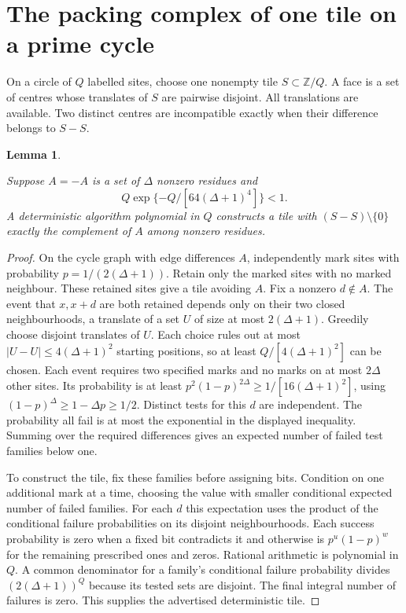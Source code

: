 \documentclass[11pt,letterpaper]{article}
\newtheorem{lemma}[theorem]{Lemma}
\numberwithin{equation}{section}
\begin{document}
\section{The packing complex of one tile on a prime cycle}\label{sec:prime}

On a circle of \(Q\) labelled sites, choose one nonempty tile \(S\subset\mathbb Z/Q\). A face
is a set of centres whose translates of \(S\) are pairwise disjoint. All translations are
available. Two distinct centres are incompatible exactly when their difference belongs to
\(S-S\).

\begin{lemma}\label{lem:tile}

Suppose \(A=-A\) is a set of \(\Delta\) nonzero residues and
\[
 Q\exp\{-Q/[64(\Delta+1)^4]\}<1 .
\]
A deterministic algorithm polynomial in \(Q\) constructs a tile with \((S-S)\setminus\{0\}\)
exactly the complement of \(A\) among nonzero residues.
\end{lemma}

\begin{proof}

On the cycle graph with edge differences \(A\), independently mark sites with probability
\(p=1/(2(\Delta+1))\). Retain only the marked sites with no marked neighbour. These retained
sites give a tile avoiding \(A\). Fix a nonzero \(d\notin A\). The event that \(x,x+d\) are
both retained depends only on their two closed neighbourhoods, a translate of a set \(U\) of
size at most \(2(\Delta+1)\). Greedily choose disjoint translates of \(U\). Each choice rules
out at most \(|U-U|\le4(\Delta+1)^2\) starting positions, so at least \(Q/[4(\Delta+1)^2]\)
can be chosen. Each event requires two specified marks and no marks on at most \(2\Delta\)
other sites. Its probability is at least \(p^2(1-p)^{2\Delta}\ge 1/[16(\Delta+1)^2]\), using
\((1-p)^\Delta\ge1-\Delta p\ge1/2\). Distinct tests for this \(d\) are independent. The
probability all fail is at most the exponential in the displayed inequality. Summing over the
required differences gives an expected number of failed test families below one.

To construct the tile, fix these families before assigning bits. Condition on one additional
mark at a time, choosing the value with smaller conditional expected number of failed
families. For each \(d\) this expectation uses the product of the conditional failure
probabilities on its disjoint neighbourhoods. Each success probability is zero when a fixed
bit contradicts it and otherwise is \(p^u(1-p)^w\) for the remaining prescribed ones and
zeros. Rational arithmetic is polynomial in \(Q\). A common denominator for a family's
conditional failure probability divides \((2(\Delta+1))^Q\) because its tested sets are
disjoint. The final integral number of failures is zero. This supplies the advertised
deterministic tile.
\end{proof}
\end{document}
